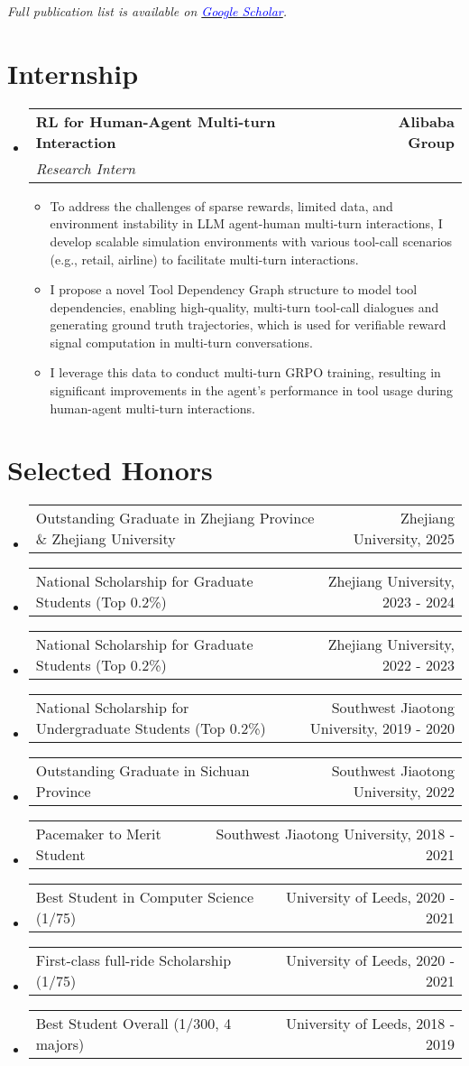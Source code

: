 \documentclass[letterpaper,11pt]{article}
\makeatletter
\newcommand{\resumeItem}[1]{
  \item\small{
    {#1 \vspace{-2pt}}
  }
}
\newcommand{\resumeSubheading}[4]{
  \vspace{-2pt}\item
    \begin{tabular*}{1.0\textwidth}[t]{l@{\extracolsep{\fill}}r}
      \textbf{#1} & \textbf{\small #2} \\
      \textit{\small#3} & \makebox[0pt][r]{\textit{\small #4}} \\

    \end{tabular*}\vspace{-10pt}
}
\newcommand{\honor}[2]{
  \vspace{-2pt}\item
    \begin{tabular*}{1.0\textwidth}[t]{l@{\extracolsep{\fill}}r}
      \small #1 & #2 \\
    \end{tabular*}\vspace{-15pt}
}
\newcommand{\honorLast}[2]{
  \vspace{-2pt}\item
    \begin{tabular*}{1.0\textwidth}[t]{l@{\extracolsep{\fill}}r}
      \small #1 & #2 \\
    \end{tabular*}\vspace{-5pt}
}
\newcommand{\resumeSubHeadingListStart}{\begin{itemize}[leftmargin=0.0in, label={}]}
\newcommand{\resumeSubHeadingListEnd}{\end{itemize}}
\newcommand{\resumeItemListStart}{\begin{itemize}}
\newcommand{\resumeItemListEnd}{\end{itemize}\vspace{-5pt}}
\makeatother
\begin{document}
\vspace{5pt}
\small{\textit{Full publication list is available on \href{https://scholar.google.com/citations?user=qG5_O40AAAAJ&hl=zh-CN}{\textcolor{blue}{Google Scholar}}.}}

\section{Internship}
  \resumeSubHeadingListStart

    \resumeSubheading
      {RL for Human-Agent Multi-turn Interaction}{Alibaba Group}
      {Research Intern}{Hangzhou, May 2025 -- Aug. 2025}
      \resumeItemListStart
        \resumeItem{To address the challenges of sparse rewards, limited data, and environment instability in LLM agent-human multi-turn interactions, I develop scalable simulation environments with various tool-call scenarios (e.g., retail, airline) to facilitate multi-turn interactions.}
        \resumeItem{I propose a novel Tool Dependency Graph structure to model tool dependencies, enabling high-quality, multi-turn tool-call dialogues and generating ground truth trajectories, which is used for verifiable reward signal computation in multi-turn conversations.}
        \resumeItem{I leverage this data to conduct multi-turn GRPO training, resulting in significant improvements in the agent’s performance in tool usage during human-agent multi-turn interactions.}
      \resumeItemListEnd
  \resumeSubHeadingListEnd

\section{Selected Honors}
  \resumeSubHeadingListStart
    \honor {Outstanding Graduate in Zhejiang Province \& Zhejiang University}{Zhejiang University, 2025}
    \honor {National Scholarship for Graduate Students (Top 0.2\%)}{Zhejiang University, 2023 - 2024}
    \honor {National Scholarship for Graduate Students (Top 0.2\%)}{Zhejiang University, 2022 - 2023}
    \honor {National Scholarship for Undergraduate Students (Top 0.2\%)}{Southwest Jiaotong University, 2019 - 2020}
    \honor {Outstanding Graduate in Sichuan Province}{Southwest Jiaotong University, 2022}
    \honor {Pacemaker to Merit Student}{Southwest Jiaotong University, 2018 - 2021}
    \honor {Best Student in Computer Science (1/75)}{University of Leeds, 2020 - 2021}
    \honor {First-class full-ride Scholarship (1/75)}{University of Leeds, 2020 - 2021}
    \honorLast {Best Student Overall (1/300, 4 majors)}{University of Leeds, 2018 - 2019}
  \resumeSubHeadingListEnd
\end{document}
